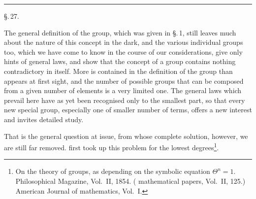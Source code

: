 \begin{center}

\end{center}

\rule{4cm}{0.4pt}

\begin{center}
\S.\,27.

\end{center}

The general definition of the group, which was given in \S.\,1, still leaves much about the nature of this concept in the dark, and the various individual groups too, which we have come to know in the course of our considerations, give only hints of general laws, and show that the concept of a group contains nothing contradictory in itself. More is contained in the definition of the group than appears at first sight, and the number of possible groups that can be composed from a given number of elements is a very limited one. The general laws which prevail here have as yet been recognised only to the smallest part, so that every new special group, especially one of smaller number of terms, offers a new interest and invites detailed study.

 That is the general question at issue, from whose complete solution, however, we are still far removed.  first took up this problem for the lowest degrees\footnote{On the theory of groups, as depending on the symbolic equation $\Theta^n = 1$. Philosophical Magazine, Vol.\ II, 1854. ( mathematical papers, Vol.\ II, 125.) American Journal of mathematics, Vol.\ I.}.
